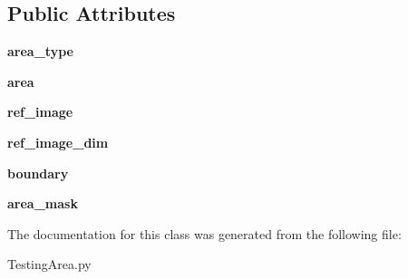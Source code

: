 \subsection*{Public Attributes}
\begin{DoxyCompactItemize}
\item 
\mbox{\label{class_testing_area_1_1_testing_area_a6f6894506f002cc732e5a5919e6aedb6}} 
{\bfseries area\+\_\+type}
\item 
\mbox{\label{class_testing_area_1_1_testing_area_ac94ef39ad7e49321a980c89757a5a3f2}} 
{\bfseries area}
\item 
\mbox{\label{class_testing_area_1_1_testing_area_a811be047946f9d005cb271bbb7003570}} 
{\bfseries ref\+\_\+image}
\item 
\mbox{\label{class_testing_area_1_1_testing_area_ad979004580d86c65e85fdcc08813e4c4}} 
{\bfseries ref\+\_\+image\+\_\+dim}
\item 
\mbox{\label{class_testing_area_1_1_testing_area_a35e34737a36d2929c7f390e7a98aa236}} 
{\bfseries boundary}
\item 
\mbox{\label{class_testing_area_1_1_testing_area_a9ade59f525eae26424f8a9f75ab5c66f}} 
{\bfseries area\+\_\+mask}
\end{DoxyCompactItemize}


The documentation for this class was generated from the following file\+:\begin{DoxyCompactItemize}
\item 
Testing\+Area.\+py\end{DoxyCompactItemize}
